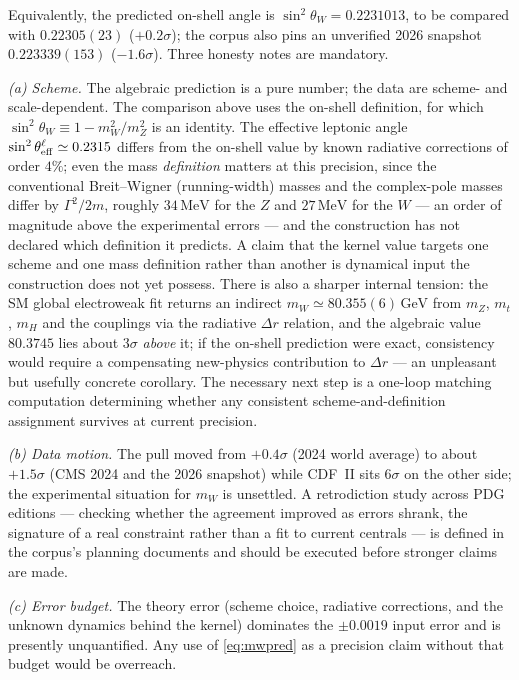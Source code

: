 \documentclass[11pt,a4paper]{article}
\theoremstyle{definition}
\newcommand{\GeV}{\,\mathrm{GeV}}
\newcommand{\MeVtext}{\,\mathrm{MeV}}
\newcommand{\swsq}{\sin^2\theta_W}
\begin{document}
Equivalently, the predicted on-shell angle is $\swsq=0.2231013$, to be
compared with $0.22305(23)$ \cite{pdg2024} ($+0.2\sigma$); the corpus also
pins an unverified 2026 snapshot $0.223339(153)$ ($-1.6\sigma$). Three
honesty notes are mandatory.

\emph{(a) Scheme.} The algebraic prediction is a pure number; the data are
scheme- and scale-dependent. The comparison above uses the on-shell
definition, for which $\swsq\equiv1-m_W^2/m_Z^2$ is an identity. The
effective leptonic angle $\sin^2\theta^{\ell}_{\rm eff}\simeq0.2315$
differs from the on-shell value by known radiative corrections of order
$4\%$; even the mass \emph{definition} matters at this precision, since the
conventional Breit--Wigner (running-width) masses and the complex-pole
masses differ by $\Gamma^2/2m$, roughly $34\MeVtext$ for the $Z$ and
$27\MeVtext$ for the $W$ --- an order of magnitude above the experimental
errors --- and the
construction has not declared which definition it predicts. A claim that
the kernel value targets one scheme and one mass definition rather than
another is dynamical input the construction does not yet possess. There is
also a sharper internal tension: the SM global electroweak fit returns an
indirect $m_W\simeq80.355(6)\GeV$ \cite{pdg2024} from $m_Z$, $m_t$, $m_H$
and the couplings via the radiative $\Delta r$ relation, and the algebraic
value $80.3745$ lies about $3\sigma$ \emph{above} it; if the on-shell
prediction were exact, consistency would require a compensating
new-physics contribution to $\Delta r$ --- an unpleasant but usefully
concrete corollary. The necessary next step is a one-loop matching
computation determining whether any consistent scheme-and-definition
assignment survives at current precision.

\emph{(b) Data motion.} The pull moved from $+0.4\sigma$ (2024 world
average) to about $+1.5\sigma$ (CMS 2024 and the 2026 snapshot) while CDF~II
sits $6\sigma$ on the other side; the experimental situation for $m_W$ is
unsettled. A retrodiction study across PDG editions --- checking whether
the agreement improved as errors shrank, the signature of a real constraint
rather than a fit to current centrals --- is defined in the corpus's
planning documents and should be executed before stronger claims are made.

\emph{(c) Error budget.} The theory error (scheme choice, radiative
corrections, and the unknown dynamics behind the kernel) dominates the
$\pm0.0019$ input error and is presently unquantified. Any use of
\eqref{eq:mwpred} as a precision claim without that budget would be
overreach.
\end{document}
